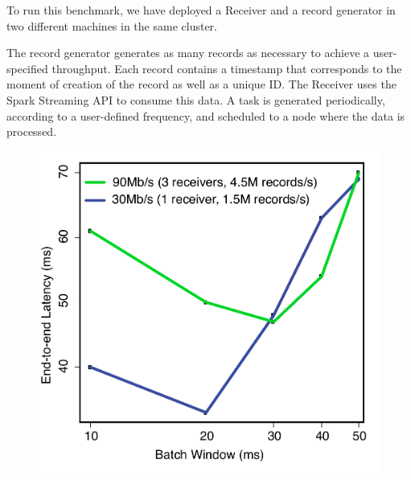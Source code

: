 
To run this benchmark, we have deployed a Receiver and a record generator in two different machines in the same cluster.

The record generator generates as many records as necessary to achieve a user-specified throughput.
Each record contains a timestamp that corresponds to the moment of creation of the record as well as a unique ID.
The Receiver uses the Spark Streaming API to consume this data. 
A task is generated periodically, according to a user-defined frequency, and scheduled to a node where the data is processed.

\begin{figure}[t!]
  \begin{center}
    \includegraphics[scale=0.35]{images_graphs/batchsize_vs_latency/batchsize_vs_latency_illustrator.pdf}
  \end{center}
  \caption{}
  \label{fig:Batchsize_vs_latency}
\end{figure}

